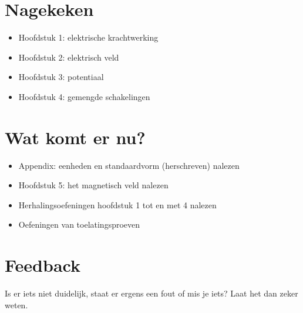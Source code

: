 \documentclass{ximera}
\begin{document}
\section*{Nagekeken}
\begin{itemize}
    \item Hoofdstuk 1: elektrische krachtwerking
    \item Hoofdstuk 2: elektrisch veld
    \item Hoofdstuk 3: potentiaal
    \item Hoofdstuk 4: gemengde schakelingen
\end{itemize}

\section*{Wat komt er nu?}
\begin{itemize}
    \item Appendix: eenheden en standaardvorm (herschreven) nalezen
    \item Hoofdstuk 5: het magnetisch veld nalezen
    \item Herhalingsoefeningen hoofdstuk 1 tot en met 4 nalezen
    \item Oefeningen van toelatingsproeven
\end{itemize}

\section*{Feedback}
Is er iets niet duidelijk, staat er ergens een fout of mis je iets? Laat het dan zeker weten.
\end{document}
